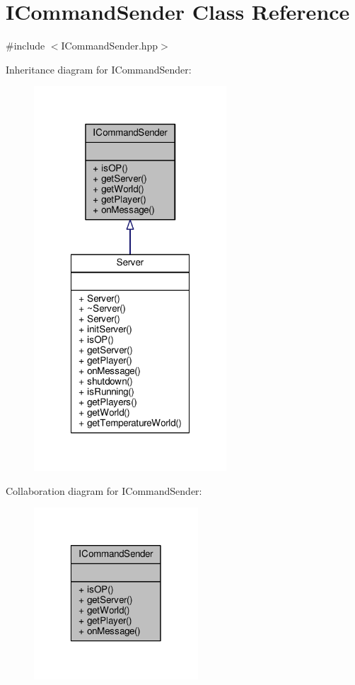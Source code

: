 \hypertarget{class_i_command_sender}{\section{I\-Command\-Sender Class Reference}
\label{class_i_command_sender}
}


{\ttfamily \#include $<$I\-Command\-Sender.\-hpp$>$}



Inheritance diagram for I\-Command\-Sender\-:
\nopagebreak
\begin{figure}[H]
\begin{center}
\leavevmode
\includegraphics[width=204pt]{class_i_command_sender__inherit__graph}
\end{center}
\end{figure}


Collaboration diagram for I\-Command\-Sender\-:
\nopagebreak
\begin{figure}[H]
\begin{center}
\leavevmode
\includegraphics[width=174pt]{class_i_command_sender__coll__graph}
\end{center}
\end{figure}
